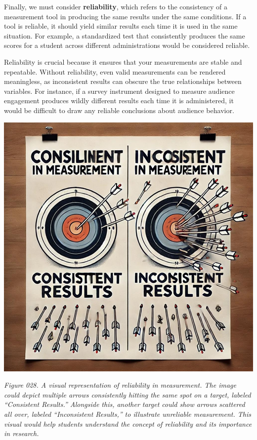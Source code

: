 \documentclass[
]{book}
\begin{document}
Finally, we must consider \textbf{reliability}, which refers to the consistency of a measurement tool in producing the same results under the same conditions. If a tool is reliable, it should yield similar results each time it is used in the same situation. For example, a standardized test that consistently produces the same scores for a student across different administrations would be considered reliable.

Reliability is crucial because it ensures that your measurements are stable and repeatable. Without reliability, even valid measurements can be rendered meaningless, as inconsistent results can obscure the true relationships between variables. For instance, if a survey instrument designed to measure audience engagement produces wildly different results each time it is administered, it would be difficult to draw any reliable conclusions about audience behavior.

\includegraphics[width=1\linewidth,height=\textheight,keepaspectratio]{images/fig028.jpg}

\emph{Figure 028. A visual representation of reliability in measurement. The image could depict multiple arrows consistently hitting the same spot on a target, labeled ``Consistent Results.'' Alongside this, another target could show arrows scattered all over, labeled ``Inconsistent Results,'' to illustrate unreliable measurement. This visual would help students understand the concept of reliability and its importance in research.}
\end{document}
